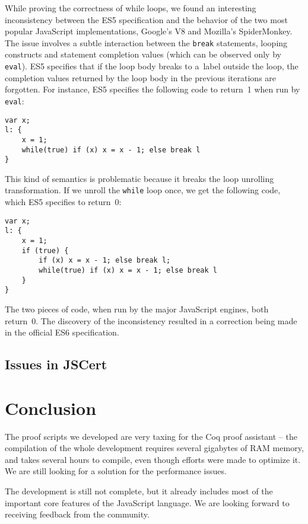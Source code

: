 \documentclass{llncs}
\newcommand{\mmi}[1]{\todo[color=blue,inline]{#1}}
\newcommand{\jsinline}[1]{\texttt{#1}}
\begin{document}
While proving the correctness of while loops, we found an interesting
inconsistency between the ES5 specification and the behavior
of the two most popular JavaScript implementations, Google's V8 and
Mozilla's SpiderMonkey. The issue involves a subtle interaction
between the \jsinline{break} statements, looping constructs
and statement completion values (which can be observed only by \jsinline{eval}).
ES5 specifies that if the loop body breaks to a~label outside the loop,
the completion values returned by the loop body in the previous iterations
are forgotten. For instance, ES5 specifies the following code to return~1 when run by \jsinline{eval}:
\begin{verbatim}
var x; 
l: { 
    x = 1; 
    while(true) if (x) x = x - 1; else break l 
}
\end{verbatim}
This kind of semantics is problematic because it breaks the loop unrolling
transformation. If we unroll the \jsinline{while} loop once, we get the
following code, which ES5 specifies to return~0:
\begin{verbatim}
var x; 
l: { 
    x = 1; 
    if (true) { 
        if (x) x = x - 1; else break l; 
        while(true) if (x) x = x - 1; else break l 
    }
}
\end{verbatim}
The two pieces of code, when run by the major JavaScript engines, both return~0.
The discovery of the inconsistency
resulted in a correction being made in the official ES6
specification\cite{esdiscuss:loop-unrolling}.

\subsection{Issues in JSCert}

\mmi{TODO}

\section{Conclusion}

The proof scripts we developed are very taxing for the Coq
proof assistant -- the compilation of the whole development
requires several gigabytes of RAM memory, and takes several
hours to compile, even though efforts were made to optimize it.
We are still looking for a solution for the performance issues.

The development is still not complete, but it already
includes most of the important core features of the
JavaScript language. We are looking forward to receiving
feedback from the community.

\printbibliography
\end{document}
